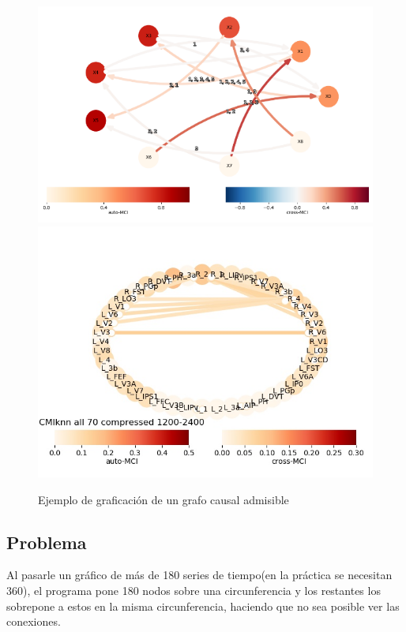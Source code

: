 \documentclass[spanish]{article}
\begin{document}
\begin{figure}[h]
\includegraphics[scale=0.95]{example1.png}
\includegraphics[scale=0.45]{example.png}
\caption{Ejemplo de graficación de un grafo causal admisible}
\end{figure}

\newpage

\subsection*{Problema}

Al pasarle un gráfico de más de 180 series de tiempo(en la práctica se necesitan 360), el programa pone 180 nodos sobre una circunferencia y los restantes los sobrepone a estos en la misma circunferencia, haciendo que no sea posible ver las conexiones.\\
\end{document}
